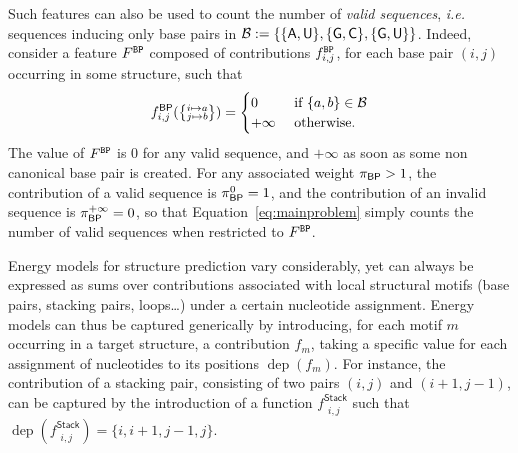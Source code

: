 \documentclass[]{bmcart}
\newcommand{\dep}{\operatorname{dep}}
\newcommand{\EbpSym}{E^{\textrm{bp}}}
\newcommand{\Def}[1]{\emph{#1}}
\newcommand{\Nuc}[1]{{\sf #1}}
\newcommand{\Ab}{\Nuc{A}}
\newcommand{\Cb}{\Nuc{C}}
\newcommand{\Gb}{\Nuc{G}}
\newcommand{\Ub}{\Nuc{U}}
\newcommand{\revised}[1]{{\color{red} #1}}
\begin{document}
\revised{
	Such features can also be used to count the number of \Def{valid sequences}, \emph{i.e.} sequences inducing only base pairs in $\mathcal{B}:=\{\{\Ab,\Ub\}, \{\Gb,\Cb\}, \{\Gb,\Ub\}\}$. Indeed, consider a feature $F^{\tt BP}$ composed of  contributions $f^{\tt BP}_{i,j}$, for each base pair $(i,j)$ occurring in some structure, such that 
	$$f^{{\sf BP}}_{i,j}(\left\{\substack{i\mapsto a\\j\mapsto b}\right\})=\begin{cases}0&\text{ if }\{a,b\}\in\mathcal{B} \\+\infty&\text{ otherwise}.\end{cases}$$ 
	The value of $F^{\tt BP}$ is $0$ for any valid sequence, and $+\infty$ as soon as some non canonical base pair is created. For any associated weight $\pi_{{\sf BP}}>1$, the contribution of a valid sequence is $\pi_{{\sf BP}}^0 = 1$, and the contribution of an invalid sequence is $\pi_{{\sf BP}}^{+\infty} = 0$, so that Equation~\ref{eq:mainproblem} simply counts the number of valid sequences when restricted to $F^{\tt BP}$.


	Energy models for structure prediction vary considerably, yet can always be expressed as sums over contributions associated with local structural motifs (base pairs, stacking pairs, loops\ldots) under a certain nucleotide assignment. Energy models can thus be captured generically by introducing, for each motif $m$ occurring in a target structure, a contribution $f_m$, taking a specific value for each assignment of nucleotides to its positions $\dep(f_m)$. For instance, the contribution of a stacking pair, consisting of two pairs $(i,j)$ and $(i+1,j-1)$, can be captured by the introduction of a function $f^{\textsf{Stack}}_{\substack{i,j}}$ such that $\dep(f^{\textsf{Stack}}_{\substack{i,j}}) = \{i,i+1,j-1,j\}$.

}



\end{document}
